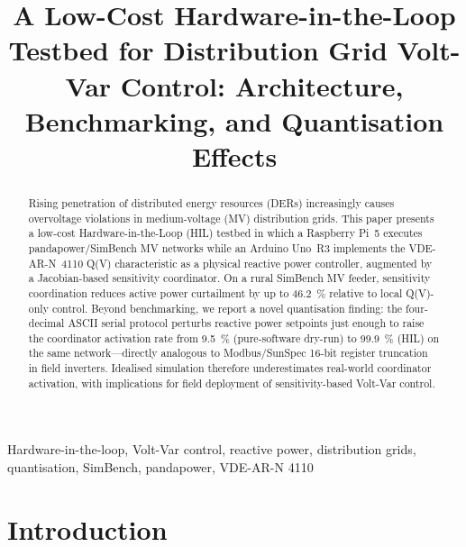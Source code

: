 \documentclass[conference]{IEEEtran}
\begin{document}
\title{A Low-Cost Hardware-in-the-Loop Testbed for Distribution Grid
Volt-Var Control: Architecture, Benchmarking, and Quantisation Effects}

\author{
}

\maketitle

\begin{abstract}
Rising penetration of distributed energy resources (DERs) increasingly
causes overvoltage violations in medium-voltage (MV) distribution grids.
This paper presents a low-cost Hardware-in-the-Loop (HIL) testbed in which
a Raspberry Pi~5 executes pandapower/SimBench MV networks while an Arduino
Uno~R3 implements the VDE-AR-N~4110 Q(V) characteristic as a physical
reactive power controller, augmented by a Jacobian-based sensitivity
coordinator. On a rural SimBench MV feeder, sensitivity coordination
reduces active power curtailment by up to \SI{46.2}{\percent} relative to
local Q(V)-only control. Beyond benchmarking, we report a novel
quantisation finding: the four-decimal ASCII serial protocol perturbs
reactive power setpoints just enough to raise the coordinator activation
rate from \SI{9.5}{\percent} (pure-software dry-run) to
\SI{99.9}{\percent} (HIL) on the same network---directly analogous to
Modbus/SunSpec 16-bit register truncation in field inverters. Idealised
simulation therefore underestimates real-world coordinator activation,
with implications for field deployment of sensitivity-based Volt-Var
control.
\end{abstract}

\begin{IEEEkeywords}
Hardware-in-the-loop, Volt-Var control, reactive power, distribution
grids, quantisation, SimBench, pandapower, VDE-AR-N 4110
\end{IEEEkeywords}

\section{Introduction}
\label{sec:intro}
\end{document}
